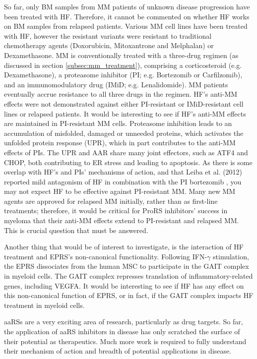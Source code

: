 So far, only BM samples from MM patients of unknown disease progression have been treated with HF\@.
Therefore, it cannot be commented on whether HF works on BM samples from relapsed patients.
Various MM cell lines have been treated with HF, however the resistant variants were resistant to traditional chemotherapy agents (Doxorubicin, Mitoxantrone and Melphalan) or Dexamethasone.
MM is conventionally treated with a three-drug regimen (as discussed in section \ref{subsec:mm_treatment}), comprising a corticosteroid (e.g. Dexamethasone), a proteasome inhibitor (PI; e.g. Bortezomib or Carfilzomib), and an immunomodulatory drug (IMiD; e.g. Lenalidomide).
MM patients eventually accrue resistance to all three drugs in the regimen.
HF's anti-MM effects were not demonstrated against either PI-resistant or IMiD-resistant cell lines or relapsed patients.
It would be interesting to see if HF's anti-MM effects are maintained in PI-resistant MM cells.
Proteasome inhibition leads to an accumulation of misfolded, damaged or unneeded proteins, which activates the unfolded protein response (UPR), which in part contributes to the anti-MM effects of PIs.
The UPR and AAR share many joint effectors, such as ATF4 and CHOP, both contributing to ER stress and leading to apoptosis.
As there is some overlap with HF's and PIs' mechanisms of action, and that Leiba et al. (2012) reported mild antagonism of HF in combination with the PI bortezomib \cite{leiba2012halofuginone}, you may not expect HF to be effective against PI-resistant MM.
Many new MM agents are approved for relapsed MM initially, rather than as first-line treatments; therefore, it would be critical for ProRS inhibitors' success in myeloma that their anti-MM effects extend to PI-resistant and relapsed MM.
This is crucial question that must be answered.

Another thing that would be of interest to investigate, is the interaction of HF treatment and EPRS's non-canonical functionality.
Following IFN-$\gamma$ stimulation, the EPRS dissociates from the human MSC to participate in the GAIT complex in myeloid cells.
The GAIT complex represses translation of inflammatory-related genes, including VEGFA.
It would be interesting to see if HF has any effect on this non-canonical function of EPRS, or in fact, if the GAIT complex impacts HF treatment in myeloid cells.

aaRSs are a very exciting area of research, particularly as drug targets.
So far, the application of aaRS inhibitors in disease has only scratched the surface of their potential as therapeutics.
Much more work is required to fully understand their mechanism of action and breadth of potential applications in disease.
